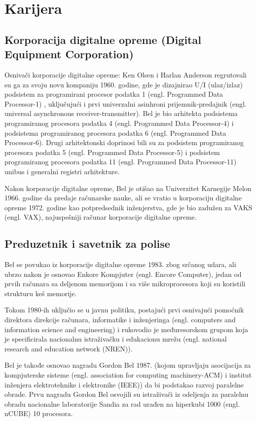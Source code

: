 \documentclass[a4paper]{article}
\begin{document}
{\section{Karijera}
\subsection{Korporacija digitalne opreme (Digital Equipment Corporation)}
\label{subsec:podnaslov1}

Osnivači korporacije digitalne opreme: Ken Olsen i Harlan Anderson regrutovali su ga za svoju novu kompaniju 1960. godine, gde je dizajnirao U/I (ulaz/izlaz) podsistem za programirani procesor podatka 1 (engl. Programmed Data Processor-1) , uključujući i prvi univerzalni asinhroni prijemnik-predajnik (engl. universal asynchronous receiver-transmitter). Bel je bio arhitekta podsistema programiranog procesora podatka 4 (engl. Programmed Data Processor-4) i podsistema programiranog procesora podatka 6 (engl. Programmed Data Processor-6). Drugi arhitektonski doprinosi bili su za podsistem programiranog procesora podatka 5 (engl. Programmed Data Processor-5) i podsistem programiranog procesora podatka 11 (engl. Programmed Data Processor-11) unibus i generalni registri arhitekture. \cite{bel2}

Nakon korporacije digitalne opreme, Bel je otišao na Univerzitet Karnegije Melon 1966. godine da predaje računarske nauke, ali se vratio u korporaciju digitalne opreme 1972. godine kao potpredsednik inženjerstva, gde je bio zadužen za VAKS (engl. VAX), najuspešniji računar korporacije digitalne opreme.

\subsection{Preduzetnik i savetnik za polise}
\label{subsec:podnaslov1}
Bel se povukao iz korporacije digitalne opreme 1983. zbog srčanog udara, ali ubrzo nakon je osnovao Enkore Kompjuter (engl. Encore Computer), jedan od prvih računara sa deljenom memorijom i sa više mikroprocesora koji su koristili strukturu keš memorije.

Tokom 1980-ih uključio se u javnu politiku, postajući prvi osnivajući pomoćnik direktora direkcije računara, informatike i inženjeringa (engl. computers and information science and engineering) i rukovodio je \-me\-đu\-re\-so\-rskom grupom koja je specificirala nacionalnu istraživačku i edukacionu mrežu (engl. national research and education network (NREN)).

Bel je takođe osnovao nagradu Gordon Bel 1987. (kojom upravljaju asocijacija za kompjuterske sisteme (engl. association for computing \-ma\-chi\-ne\-ry-ACM) i institut inženjera elektrotehnike i elektronike (IEEE)) da bi podstakao razvoj paralelne obrade. Prvu nagradu Gordon Bel osvojili su istraživači iz odeljenja za paralelnu obradu nacionalne laboratorije Sandia za rad urađen na hiperkubi 1000 (engl. nCUBE) 10 procesora.

}
\end{document}
